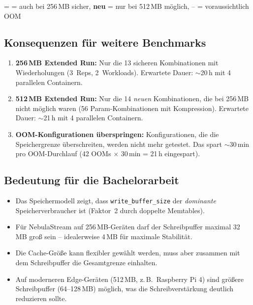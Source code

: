 \documentclass[11pt,a4paper]{scrartcl}
\begin{document}
{\small \textsf{=} = auch bei 256\,MB sicher, \textbf{neu} = nur bei 512\,MB m\"oglich, -- = voraussichtlich OOM}

\subsection*{Konsequenzen f\"ur weitere Benchmarks}

\begin{enumerate}[nosep]
  \item \textbf{256\,MB Extended Run:} Nur die 13 sicheren Kombinationen mit
        Wiederholungen (3~Reps, 2~Workloads). Erwartete Dauer: $\sim$20\,h mit
        4 parallelen Containern.
  \item \textbf{512\,MB Extended Run:} Nur die 14 \emph{neuen} Kombinationen,
        die bei 256\,MB nicht m\"oglich waren (56 Param-Kombinationen mit Kompression).
        Erwartete Dauer: $\sim$21\,h mit 4 parallelen Containern.
  \item \textbf{OOM-Konfigurationen \"uberspringen:} Konfigurationen, die die
        Speichergrenze \"uberschreiten, werden nicht mehr getestet. Das spart
        $\sim$30\,min pro OOM-Durchlauf (42 OOMs $\times$ 30\,min = 21\,h eingespart).
\end{enumerate}

\subsection*{Bedeutung f\"ur die Bachelorarbeit}

\begin{itemize}[nosep]
  \item Das Speichermodell zeigt, dass \texttt{write\_buffer\_size} der
        \emph{dominante} Speicherverbraucher ist (Faktor~2 durch doppelte Memtables).
  \item F\"ur NebulaStream auf 256\,MB-Ger\"aten darf der Schreibpuffer maximal
        32\,MB gro\ss{} sein -- idealerweise 4\,MB f\"ur maximale Stabilit\"at.
  \item Die Cache-Gr\"o\ss e kann flexibler gew\"ahlt werden, muss aber zusammen
        mit dem Schreibpuffer die Gesamtgrenze einhalten.
  \item Auf moderneren Edge-Ger\"aten (512\,MB, z.\,B.\ Raspberry Pi 4) sind
        gr\"o\ss ere Schreibpuffer (64--128\,MB) m\"oglich, was die
        Schreibverst\"arkung deutlich reduzieren sollte.
\end{itemize}
\end{document}
